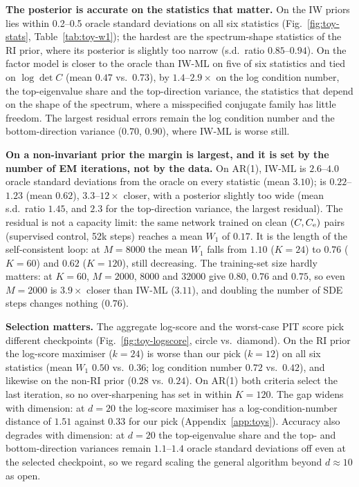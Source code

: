 \textbf{The posterior is accurate on the statistics that matter.}
On the IW priors \scsi{} lies within 0.2--0.5 oracle standard deviations on all six statistics (Fig.~\ref{fig:toy-stats}, Table~\ref{tab:toy-w1}); the hardest are the spectrum-shape statistics of the RI prior, where its posterior is slightly too narrow (s.d.\ ratio $0.85$--$0.94$).
On the factor model \scsi{} is closer to the oracle than IW-ML on five of six statistics and tied on $\log\det C$ (mean $0.47$ vs.\ $0.73$), by $1.4$--$2.9\times$ on the log condition number, the top-eigenvalue share and the top-direction variance, the statistics that depend on the shape of the spectrum, where a misspecified conjugate family has little freedom.
The largest residual errors remain the log condition number and the bottom-direction variance ($0.70$, $0.90$), where IW-ML is worse still.

\textbf{On a non-invariant prior the margin is largest, and it is set by the number of EM iterations, not by the data.}
On AR(1), IW-ML is $2.6$--$4.0$ oracle standard deviations from the oracle on every statistic (mean $3.10$); \scsi{} is $0.22$--$1.23$ (mean $0.62$), $3.3$--$12\times$ closer, with a posterior slightly too wide (mean s.d.\ ratio $1.45$, and $2.3$ for the top-direction variance, the largest residual).
The residual is not a capacity limit: the same network trained on clean $(C,C_{\mathrm{e}})$ pairs (supervised control, 52k steps) reaches a mean $W_1$ of $0.17$.
It is the length of the self-consistent loop: at $M{=}8000$ the mean $W_1$ falls from $1.10$ ($K{=}24$) to $0.76$ ($K{=}60$) and $0.62$ ($K{=}120$), still decreasing.
The training-set size hardly matters: at $K{=}60$, $M{=}2000$, $8000$ and $32000$ give $0.80$, $0.76$ and $0.75$, so even $M{=}2000$ is $3.9\times$ closer than IW-ML ($3.11$), and doubling the number of SDE steps changes nothing ($0.76$).

\textbf{Selection matters.}
The aggregate log-score and the worst-case PIT score pick different checkpoints (Fig.~\ref{fig:toy-logscore}, circle vs.\ diamond).
On the RI prior the log-score maximiser ($k{=}24$) is worse than our pick ($k{=}12$) on all six statistics (mean $W_1$ $0.50$ vs.\ $0.36$; log condition number $0.72$ vs.\ $0.42$), and likewise on the non-RI prior ($0.28$ vs.\ $0.24$).
On AR(1) both criteria select the last iteration, so no over-sharpening has set in within $K{=}120$.
The gap widens with dimension: at $d{=}20$ the log-score maximiser has a log-condition-number distance of $1.51$ against $0.33$ for our pick (Appendix~\ref{app:toys}).
Accuracy also degrades with dimension: at $d{=}20$ the top-eigenvalue share and the top- and bottom-direction variances remain $1.1$--$1.4$ oracle standard deviations off even at the selected checkpoint, so we regard scaling the general algorithm beyond $d\approx 10$ as open.

